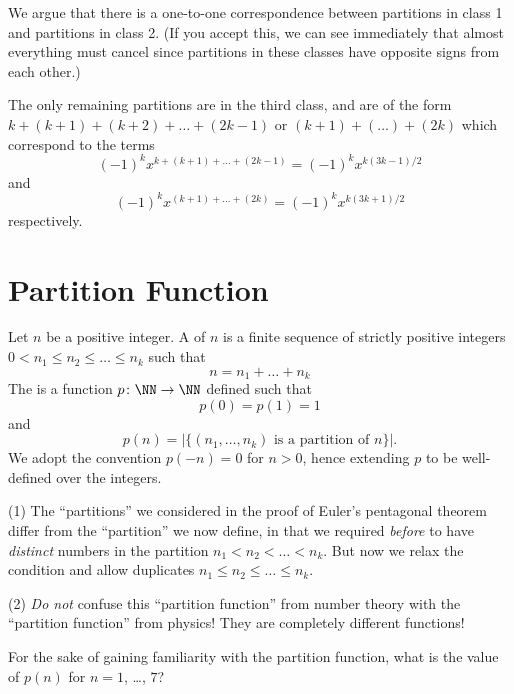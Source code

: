 \documentclass{article}
\begin{document}
 We argue that there is a one-to-one correspondence between
partitions in class 1 and partitions in class 2. (If you accept this, we
can see immediately that almost everything must cancel since partitions
in these classes have opposite signs from each other.)

 The only remaining partitions are in the third class, and
are of the form $k+(k+1)+(k+2)+\dots+(2k-1)$ or $(k+1)+(\dots)+(2k)$
which correspond to the terms
\begin{equation}
(-1)^{k}x^{k+(k+1)+\dots+(2k-1)}=(-1)^{k}x^{k(3k-1)/2}
\end{equation}
and
\begin{equation}
(-1)^{k}x^{(k+1)+\dots+(2k)}=(-1)^{k}x^{k(3k+1)/2}
\end{equation}
respectively.

\section{Partition Function}

Let $n$ be a positive integer. A  of $n$ is a finite
sequence of strictly positive integers $0<n_{1}\leq n_{2}\leq\dots\leq n_{k}$
such that
\begin{equation}
  n = n_{1} + \dots + n_{k}
\end{equation}
The  is a function $p\colon\NN\to\NN$ defined
such that
\begin{equation}
  p(0)=p(1)=1
\end{equation}
and
\begin{equation}
  p(n) = |\{(n_{1},\dots,n_{k})\mbox{ is a partition of }n\}|.
\end{equation}
We adopt the convention $p(-n)=0$ for $n>0$, hence extending $p$ to be
well-defined over the integers.

 (1) The ``partitions'' we considered in the proof of
Euler's pentagonal theorem differ from the ``partition'' we now define,
in that we required \emph{before} to have \emph{distinct} numbers in the
partition $n_{1}<n_{2}<\dots<n_{k}$. But now we relax the condition and
allow duplicates $n_{1}\leq n_{2}\leq\dots\leq n_{k}$.

(2) \emph{Do not} confuse this ``partition function'' from number theory
with the ``partition function'' from physics! They are completely
different functions!

 For the sake of gaining familiarity with the partition
function, what is the value of $p(n)$ for $n=1$, \dots, $7$?
\end{document}

